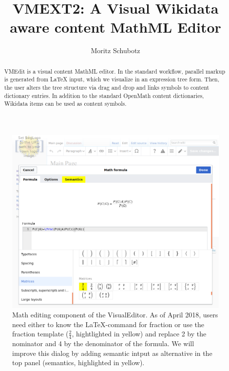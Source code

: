 \documentclass{llncs}
\begin{document}
\title{VMEXT2: A Visual Wikidata aware content MathML Editor}

\author{
   Moritz Schubotz
}


\maketitle

\begin{abstract}
VMEdit is a visual content MathML editor.
In the standard workflow, parallel markup is generated from LaTeX input, which we visualize in an expression tree form.
Then, the user alters the tree structure via drag and drop and links symbols to content dictionary entries.
In addition to the standard OpenMath content dictionaries, Wikidata items can be used as content symbols.
\end{abstract}

\begin{figure}[t]
\includegraphics[width=\textwidth]{images/overview.png}
\caption{Math editing component of the VisualEditor.
 As of April 2018, users need either to know the {\LaTeX}-command for fraction or use the fraction template ($\frac{2}{4}$, hightlighted in yellow) and replace 2 by the nominator and 4 by the denominator of the formula.
 We will improve this dialog by adding semantic intput as alternative in the top panel (semantics, highlighted in yellow).}\label{fig.overview}
\end{figure}
\end{document}
